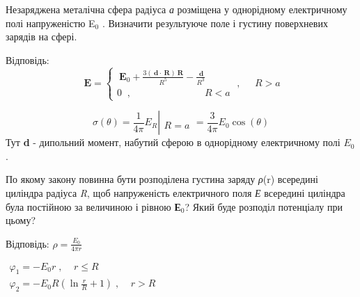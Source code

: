 \documentclass[]{ProblemBook}
\begin{document}
\begin{problem}
   Незаряджена металічна сфера радіуса \textit{а} розміщена у однорідному електричному полі напруженістю E$_{0}$ . Визначити результуюче поле і густину поверхневих зарядів на сфері.
	
\begin{solution}
	Відповідь:
		\[\ \textbf{E} = \left\{ {\begin{array}{*{20}{c}}
{{{\ \textbf{E}}_0} + \frac{{3\left( {\ \textbf{d} \cdot \ \textbf{R}} \right)\ \textbf{R}}}{{{R^5}}} - \frac{{\ \textbf{d}}}{{{R^3}}}}\\
{0\;\;,\;\;\;\;\;\;\;\;\;\;\;\;\;\;\;\;\;\;\;\;\;\;\;\;\;\;\;R < a}
\end{array}} \right.\;,\;\;\;\;\;R > a\]

\[\sigma \left( \theta  \right) = \left. {\frac{1}{{4\pi }}{E_R}} \right|\begin{array}{*{20}{c}}
{}\\
{R = a}
\end{array} = \frac{3}{{4\pi }}{E_0}\cos \left( \theta  \right)\]
Тут \textbf{d} - дипольний момент, набутий сферою в однорідному електричному полі $E_{0}$.
\end{solution}
\end{problem}


\begin{problem}
    По якому закону повинна бути розподілена густина заряду \textit{ρ}(r) всередині циліндра радіуса \textit{R}, щоб напруженість електричного поля \textit{Е} всередині циліндра була постійною за величиною і рівною \textbf{Е}$_{0}$? Який буде розподіл потенціалу при цьому?

	\begin{solution}
	Відповідь: 
$\rho  = \frac{{{E_0}}}{{4\pi r}}$

$\begin{array}{*{20}{c}}
{{\varphi _1} =  - {E_0}r\;,\;\;\;\;r \le R}\\
{{\varphi _2} =  - {E_0}R\left( {\ln \frac{r}{R} + 1} \right)\;,\;\;\;\;r > R}
\end{array}$
\end{solution}
\end{problem}
\end{document}
